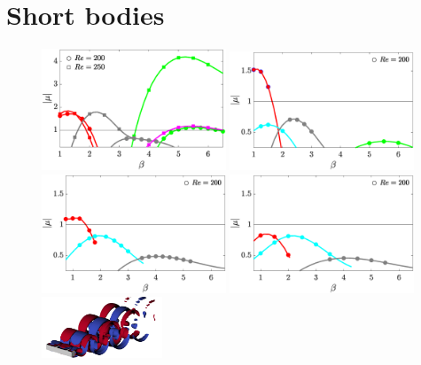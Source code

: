 \section{Short bodies}

\begin{figure}
  \centering
  \includegraphics[width=0.49\textwidth]{./fig/AR1s/multipliers_AR1.eps}
  \includegraphics[width=0.49\textwidth]{./fig/AR1s/multipliers_AR1p25.eps}
  \includegraphics[width=0.49\textwidth]{./fig/AR1s/multipliers_AR1p5.eps}
  \includegraphics[width=0.49\textwidth]{./fig/AR1s/multipliers_AR1p75.eps} \\
  \includegraphics[width=0.32\textwidth]{./fig/AR1s/Floqetmode_beta_1p2_Re200_AR1_A.png}

\end{figure}
